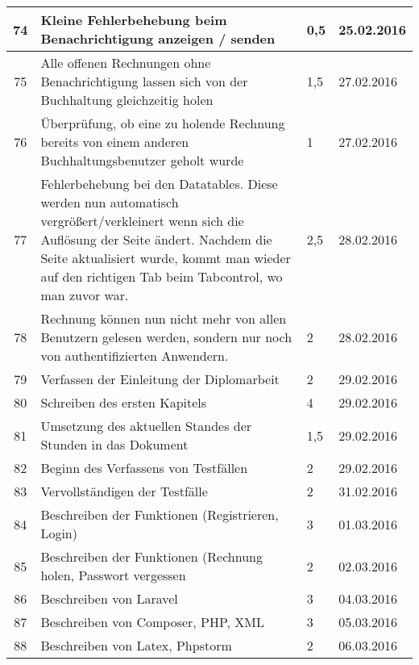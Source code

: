 \begin{longtable}[h]{| c | p{11.6cm} | l | l |}
74 & Kleine Fehlerbehebung beim Benachrichtigung anzeigen / senden & 0,5 & 25.02.2016 \\ \hline

75 & Alle offenen Rechnungen ohne Benachrichtigung lassen sich von der Buchhaltung gleichzeitig holen & 1,5 & 27.02.2016 \\ \hline

76 & Überprüfung, ob eine zu holende Rechnung bereits von einem anderen Buchhaltungsbenutzer geholt wurde & 1 & 27.02.2016 \\ \hline

77 & Fehlerbehebung bei den Datatables. Diese werden nun automatisch vergrößert/verkleinert wenn sich die Auflösung der Seite ändert. Nachdem die Seite aktualisiert wurde, kommt man wieder auf den richtigen Tab beim Tabcontrol, wo man zuvor war. & 2,5 & 28.02.2016 \\ \hline

78 & Rechnung können nun nicht mehr von allen Benutzern gelesen werden, sondern nur noch von authentifizierten Anwendern. & 2 & 28.02.2016 \\ \hline

79 & Verfassen der Einleitung der Diplomarbeit & 2 & 29.02.2016 \\ \hline

80 & Schreiben des ersten Kapitels & 4 & 29.02.2016 \\ \hline

81 & Umsetzung des aktuellen Standes der Stunden in das Dokument & 1,5 & 29.02.2016 \\ \hline

82 & Beginn des Verfassens von Testfällen & 2 & 29.02.2016 \\ \hline

83 & Vervollständigen der Testfälle & 2 & 31.02.2016 \\ \hline

84 & Beschreiben der Funktionen (Registrieren, Login) & 3 & 01.03.2016 \\ \hline

85 & Beschreiben der Funktionen (Rechnung holen, Passwort vergessen & 2 & 02.03.2016 \\ \hline

86 & Beschreiben von Laravel & 3 & 04.03.2016 \\ \hline

87 & Beschreiben von Composer, PHP, XML & 3 & 05.03.2016 \\ \hline

88 & Beschreiben von Latex, Phpstorm & 2 & 06.03.2016 \\ \hline


\end{longtable}
